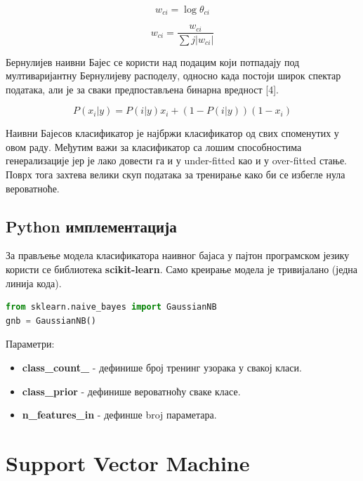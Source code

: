 \documentclass[11pt]{article} %
\begin{document}
\begin{equation}
w_{ci} = \log{\theta_{ci}}
\end{equation}

\begin{equation}
w_{ci} = \frac{w_{ci}}{\sum{j}{|w_{ci}|}}
\end{equation}

Бернулијев наивни Бајес се користи над подацим који потпадају под мултиваријантну Бернулијеву расподелу, односно када постоји широк спектар података, али је за сваки предпостављена бинарна вредност [4].

\begin{equation}
P(x_{i}|y) = P(i|y)x_{i} + (1 - P(i|y))(1-x_{i})
\end{equation}

Наивни Бајесов класификатор је најбржи класификатор од свих споменутих у овом раду. Међутим важи за класификатор са лошим способностима генерализације јер је лако довести га и у under-fitted као и у over-fitted стање. Поврх тога захтева велики скуп података за тренирање како би се избегле нула вероватноће.

\subsection{Python имплементација}

За прављење модела класификатора наивног бајаса у пајтон програмском језику користи се библиотека \textbf{scikit-learn}. Само креирање модела је тривијалано (једна линија кода).

\begin{lstlisting}[language=Python,title=Пример 4. Наивни Бајас]
from sklearn.naive_bayes import GaussianNB
gnb = GaussianNB()
\end{lstlisting}

Параметри:

\begin{itemize}
	\item \textbf{class\_count\_} - дефинише број тренинг узорака у свакој класи.
	\item \textbf{class\_prior} - дефинише вероватноћу сваке класе.
	\item \textbf{n\_features\_in} - дефинше broj параметара.
\end{itemize}

\section{Support Vector Machine}
\end{document}
